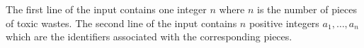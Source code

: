 The first line of the input contains one integer $n$ where $n$ is the 
number of pieces of toxic wastes.
The second line of the input contains $n$ positive integers $a_1,\dots,a_n$
which are the identifiers associated with the corresponding pieces.
